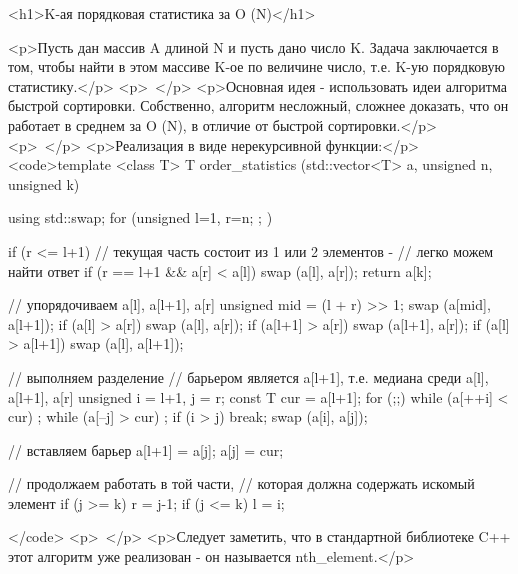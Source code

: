 <h1>K-ая порядковая статистика за O (N)</h1>

<p>Пусть дан массив A длиной N и пусть дано число K. Задача заключается в том, чтобы найти в этом массиве K-ое по величине число, т.е. K-ую порядковую статистику.</p>
<p> </p>
<p>Основная идея - использовать идеи алгоритма быстрой сортировки. Собственно, алгоритм несложный, сложнее доказать, что он работает в среднем за O (N), в отличие от быстрой сортировки.</p>
<p> </p>
<p>Реализация в виде нерекурсивной функции:</p>
<code>template <class T>
T order_statistics (std::vector<T> a, unsigned n, unsigned k)
{
	using std::swap;
	for (unsigned l=1, r=n; ; )
	{
		
		if (r <= l+1)
		{
			// текущая часть состоит из 1 или 2 элементов -
			//	 легко можем найти ответ
			if (r == l+1 && a[r] < a[l])
				swap (a[l], a[r]);
			return a[k];
		}
		
		// упорядочиваем a[l], a[l+1], a[r]
		unsigned mid = (l + r) >> 1;
		swap (a[mid], a[l+1]);
		if (a[l] > a[r])
			swap (a[l], a[r]);
		if (a[l+1] > a[r])
			swap (a[l+1], a[r]);
		if (a[l] > a[l+1])
			swap (a[l], a[l+1]);
		
		// выполняем разделение
		// барьером является a[l+1], т.е. медиана среди a[l], a[l+1], a[r]
		unsigned
			i = l+1,
			j = r;
		const T
			cur = a[l+1];
		for (;;)
		{
			while (a[++i] < cur) ;
			while (a[--j] > cur) ;
			if (i > j)
				break;
			swap (a[i], a[j]);
		}

		// вставляем барьер
		a[l+1] = a[j];
		a[j] = cur;

		// продолжаем работать в той части,
		//	 которая должна содержать искомый элемент
		if (j >= k)
			r = j-1;
		if (j <= k)
			l = i;

	}
}</code>
<p> </p>
<p>Следует заметить, что в стандартной библиотеке C++ этот алгоритм уже реализован - он называется nth_element.</p>